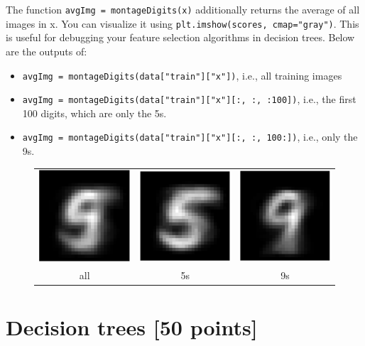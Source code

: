 \documentclass[10pt,letterpaper]{article}
\newcommand{\cmd}[1] {{\color{blue}\texttt{#1}}}
\begin{document}
The function \cmd{avgImg = montageDigits(x)} additionally returns the average of all images in x. You can visualize it using \cmd{plt.imshow(scores, cmap="gray")}. This is useful for debugging your feature selection algorithms in decision trees. Below are the outputs of: 
\begin{itemize}
\item \cmd{avgImg = montageDigits(data["train"]["x"])}, i.e., all training images
\item \cmd{avgImg = montageDigits(data["train"]["x"][:, :, :100])},
  i.e., the first 100 digits, which are only the 5s. 
\item \cmd{avgImg = montageDigits(data["train"]["x"][:, :, 100:])},
  i.e., only the 9s. 
\end{itemize}

\begin{figure}[h]
\centering
\begin{tabular}{ccc}
\includegraphics[width=0.2\linewidth]{avg59.png} &
\includegraphics[width=0.2\linewidth]{avg5.png} &
\includegraphics[width=0.2\linewidth]{avg9.png} \\
all & 5s & 9s
\end{tabular}
\end{figure}

\newpage
\section{Decision trees [50 points]}
\end{document}
